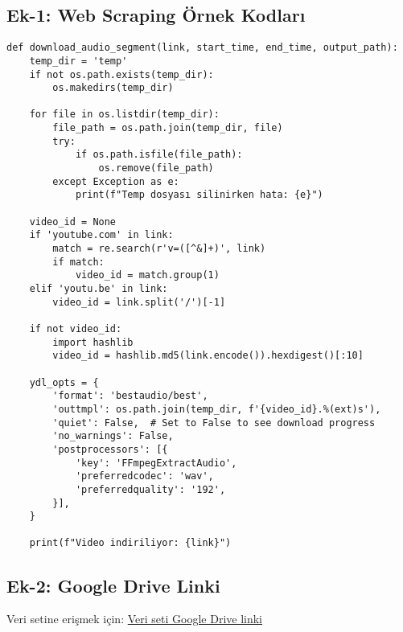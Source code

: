 \documentclass[conference]{IEEEtran}
\begin{document}
\subsection*{Ek-1: Web Scraping Örnek Kodları}
\begin{lstlisting}
def download_audio_segment(link, start_time, end_time, output_path):
    temp_dir = 'temp'
    if not os.path.exists(temp_dir):
        os.makedirs(temp_dir)
    
    for file in os.listdir(temp_dir):
        file_path = os.path.join(temp_dir, file)
        try:
            if os.path.isfile(file_path):
                os.remove(file_path)
        except Exception as e:
            print(f"Temp dosyası silinirken hata: {e}")
    
    video_id = None
    if 'youtube.com' in link:
        match = re.search(r'v=([^&]+)', link)
        if match:
            video_id = match.group(1)
    elif 'youtu.be' in link:
        video_id = link.split('/')[-1]
    
    if not video_id:
        import hashlib
        video_id = hashlib.md5(link.encode()).hexdigest()[:10]
    
    ydl_opts = {
        'format': 'bestaudio/best',
        'outtmpl': os.path.join(temp_dir, f'{video_id}.%(ext)s'),
        'quiet': False,  # Set to False to see download progress
        'no_warnings': False,
        'postprocessors': [{
            'key': 'FFmpegExtractAudio',
            'preferredcodec': 'wav',
            'preferredquality': '192',
        }],
    }
    
    print(f"Video indiriliyor: {link}")
\end{lstlisting}

\subsection*{Ek-2: Google Drive Linki}
Veri setine erişmek için: \href{https://drive.google.com/drive/u/1/folders/1XADkuWGJVvxvtqV9zuuSkaGYZg5Gixzo}{Veri seti Google Drive linki}
\end{document}
